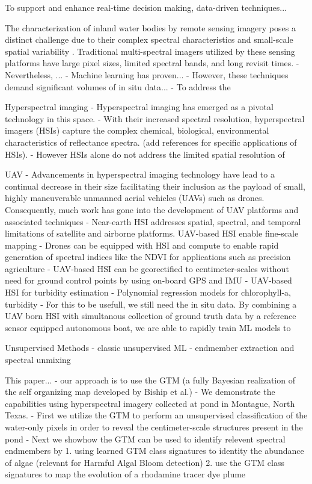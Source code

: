 \documentclass{article}
\begin{document}
To support and enhance real-time decision making, data-driven techniques...


The characterization of inland water bodies by remote sensing imagery poses a distinct challenge due to their complex spectral characteristics and small-scale spatial variability \cite{ritchie2003remote}. Traditional multi-spectral imagers utilized by these sensing platforms have large pixel sizes, limited spectral bands, and long revisit times.
- Nevertheless, ... 
- Machine learning has proven... 
- However, these techniques demand significant volumes of in situ data...
- To address the 

Hyperspectral imaging
- Hyperspectral imaging has emerged as a pivotal technology in this space.
- With their increased spectral resolution, hyperspectral imagers (HSIs) capture the complex chemical, biological, environmental characteristics of reflectance spectra. (add references for specific applications of HSIs). 
- However HSIs alone do not address the limited spatial resolution of 


UAV
- Advancements in hyperspectral imaging technology have lead to a continual decrease in their size facilitating their inclusion as the payload of small, highly maneuverable unmanned aerial vehicles (UAVs) such as drones. Consequently, much work has gone into the development of UAV platforms and associated techniques 
- Near-earth HSI addresses spatial, spectral, and temporal limitations of satellite and airborne platforms. UAV-based HSI enable fine-scale mapping \cite{banerjee2020uav}
- Drones can be equipped with HSI and compute to enable rapid generation of spectral indices like the NDVI for applications such as precision agriculture \cite{horstrand2019uav}
- UAV-based HSI can be georectified to centimeter-scales without need for ground control points by using on-board GPS and IMU \cite{arroyo2019implementation}
- UAV-based HSI for turbidity estimation \cite{vogt2016near}
- Polynomial regression models for chlorophyll-a, turbidity \cite{zhang2022selection}
- For this to be usefull, we still need the in situ data. By combining a UAV born HSI with simultanous collection of ground truth data by a reference sensor equipped autonomous boat, we are able to rapidly train ML models to 


Unsupervised Methods
- classic unsupervised ML
- endmember extraction and spectral unmixing

This paper...
- our approach is to use the GTM (a fully Bayesian realization of the self organizing map developed by Biship et al.)
- We demonstrate the capabilities using hyperspectral imagery collected at pond in Montague, North Texas. 
- First we utilize the GTM to perform an unsupervised classification of the water-only pixels in order to reveal the centimeter-scale structures present in the pond
- Next we showhow the GTM can be used to identify relevent spectral endmembers by 
    1. using learned GTM class signatures to identity the abundance of algae (relevant for Harmful Algal Bloom detection)
    2. use the GTM class signatures to map the evolution of a rhodamine tracer dye plume
\end{document}

